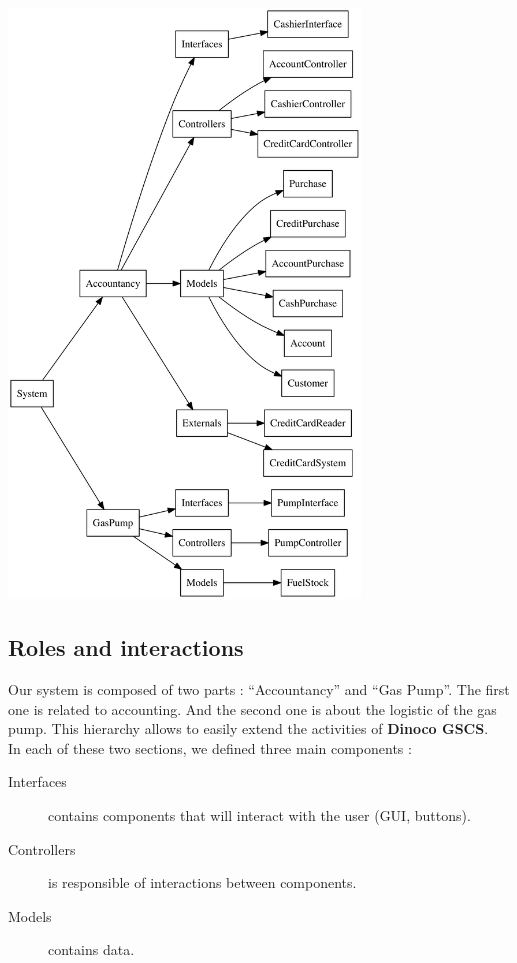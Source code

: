 \documentclass[11pt, a4paper]{article}
\begin{document}
\begin{center}
\centerline{\includegraphics[width=0.7\textwidth]{hierarchical.png}}
\end{center}

\subsection{Roles and interactions}

Our system is composed of two parts : ``Accountancy'' and ``Gas Pump''. The first one is related to accounting. And the second one is about the logistic of the gas pump. This hierarchy allows to easily extend the activities of \textbf{Dinoco GSCS}.\\


In each of these two sections, we defined three main components : 
\begin{description}
\item[Interfaces] contains components that will interact with the user (GUI, buttons).
\item[Controllers] is responsible of interactions between components.
\item[Models] contains data.
\end{description}
\end{document}
